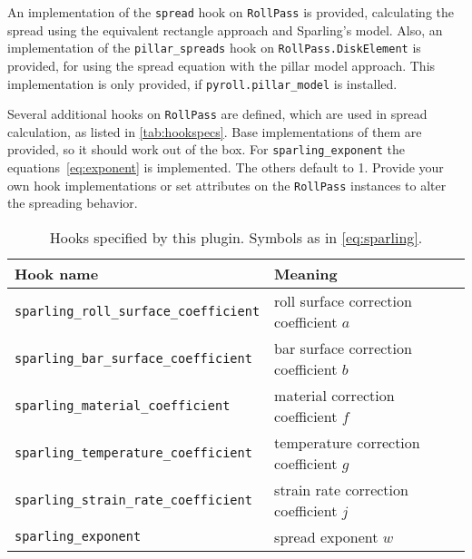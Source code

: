 \documentclass[11pt]{PyRollDocs}
\begin{document}
    An implementation of the \lstinline{spread} hook on \lstinline{RollPass} is provided,
    calculating the spread using the equivalent rectangle approach and Sparling's model.
    Also, an implementation of the \lstinline{pillar_spreads} hook on \lstinline{RollPass.DiskElement} is provided,
    for using the spread equation with the pillar model approach.
    This implementation is only provided, if \texttt{pyroll.pillar\_model} is installed.

    Several additional hooks on \lstinline{RollPass} are defined, which are used in spread calculation, as listed in \autoref{tab:hookspecs}.
    Base implementations of them are provided, so it should work out of the box.
    For \lstinline{sparling_exponent} the equations~\ref{eq:exponent} is implemented.
    The others default to \num{1}.
    Provide your own hook implementations or set attributes on the \lstinline{RollPass} instances to alter the spreading behavior.

    \begin{table}
        \centering
        \caption{Hooks specified by this plugin. Symbols as in \autoref{eq:sparling}.}
        \label{tab:hookspecs}
        \begin{tabular}{ll}
            \toprule
            Hook name                                     & Meaning                                 \\
            \midrule
            \texttt{sparling\_roll\_surface\_coefficient} & roll surface correction coefficient $a$ \\
            \texttt{sparling\_bar\_surface\_coefficient}  & bar surface correction coefficient $b$  \\
            \texttt{sparling\_material\_coefficient}      & material correction coefficient $f$     \\
            \texttt{sparling\_temperature\_coefficient}      & temperature correction coefficient $g$  \\
            \texttt{sparling\_strain\_rate\_coefficient}      & strain rate correction coefficient $j$  \\
            \texttt{sparling\_exponent}                   & spread exponent $w$                     \\
            \bottomrule
        \end{tabular}
    \end{table}

    \printbibliography
\end{document}
